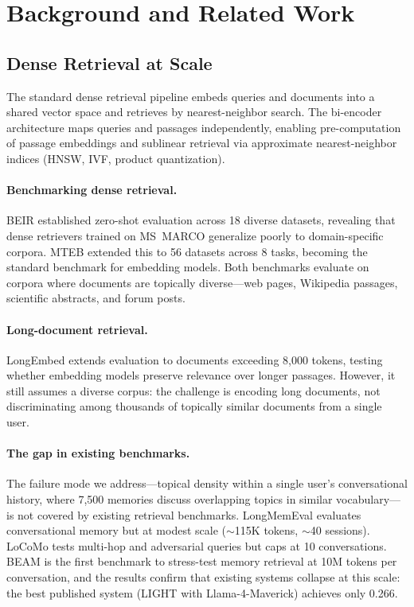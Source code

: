 \documentclass[11pt]{article}
\begin{document}
\section{Background and Related Work}
\label{sec:background}

\subsection{Dense Retrieval at Scale}
\label{sec:dense-retrieval}

The standard dense retrieval pipeline embeds queries and documents
into a shared vector space and retrieves by nearest-neighbor search.
The bi-encoder architecture \citep{Karpukhin2020,Reimers2019} maps
queries and passages independently, enabling pre-computation of
passage embeddings and sublinear retrieval via approximate
nearest-neighbor indices (HNSW, IVF, product quantization).

\paragraph{Benchmarking dense retrieval.}
BEIR \citep{Thakur2021} established zero-shot evaluation across 18
diverse datasets, revealing that dense retrievers trained on MS~MARCO
generalize poorly to domain-specific corpora.  MTEB
\citep{Muennighoff2023} extended this to 56 datasets across 8 tasks,
becoming the standard benchmark for embedding models.  Both benchmarks
evaluate on corpora where documents are topically diverse---web pages,
Wikipedia passages, scientific abstracts, and forum posts.

\paragraph{Long-document retrieval.}
LongEmbed \citep{Zhu2024} extends evaluation to documents exceeding
8,000 tokens, testing whether embedding models preserve relevance
over longer passages.  However, it still assumes a diverse corpus:
the challenge is encoding long documents, not discriminating among
thousands of topically similar documents from a single user.

\paragraph{The gap in existing benchmarks.}
The failure mode we address---topical density within a single user's
conversational history, where 7,500 memories discuss overlapping
topics in similar vocabulary---is not covered by existing retrieval
benchmarks.  LongMemEval \citep{Wu2025} evaluates conversational
memory but at modest scale ($\sim$115K tokens, $\sim$40 sessions).
LoCoMo \citep{Maharana2024} tests multi-hop and adversarial queries
but caps at 10 conversations.  BEAM is the first benchmark to
stress-test memory retrieval at 10M tokens per conversation, and
the results confirm that existing systems collapse at this scale:
the best published system (LIGHT with Llama-4-Maverick) achieves
only 0.266.
\end{document}
